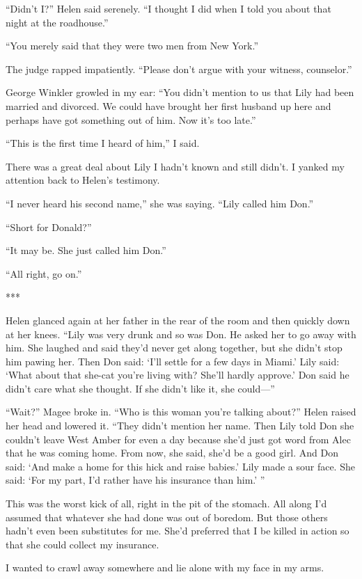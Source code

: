 {“Didn’t I?” Helen said serenely. “I thought I did when I told you about that night at the roadhouse.”

“You merely said that they were two men from New York.”

The judge rapped impatiently. “Please don’t argue with your witness, counselor.”

George Winkler growled in my ear: “You didn’t mention to us that Lily had been married and divorced. We could have brought her first husband up here and perhaps have got something out of him. Now it’s too late.”

“This is the first time I heard of him,” I said.

There was a great deal about Lily I hadn’t known and still didn’t. I yanked my attention back to Helen’s testimony.

“I never heard his second name,” she was saying. “Lily called him Don.”

“Short for Donald?”

“It may be. She just called him Don.”

“All right, go on.”

***

Helen glanced again at her father in the rear of the room and then quickly down at her knees. “Lily was very drunk and so was Don. He asked her to go away with him. She laughed and said they’d never get along together, but she didn’t stop him pawing her. Then Don said: ‘I’ll settle for a few days in Miami.’ Lily said: ‘What about that she-cat you’re living with? She’ll hardly approve.’ Don said he didn’t care what she thought. If she didn’t like it, she could—”

“Wait?” Magee broke in. “Who is this woman you’re talking about?” Helen raised her head and lowered it. “They didn’t mention her name. Then Lily told Don she couldn’t leave West Amber for even a day because she’d just got word from Alec that he was coming home. From now, she said, she’d be a good girl. And Don said: ‘And make a home for this hick and raise babies.’ Lily made a sour face. She said: ‘For my part, I’d rather have his insurance than him.’ ”

This was the worst kick of all, right in the pit of the stomach. All along I’d assumed that whatever she had done was out of boredom. But those others hadn’t even been substitutes for me. She’d preferred that I be killed in action so that she could collect my insurance.

I wanted to crawl away somewhere and lie alone with my face in my arms.

}
